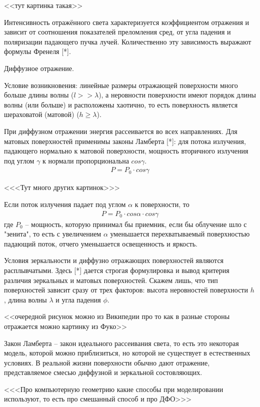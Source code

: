 <<тут картинка такая>>

Интенсивность отражённого света характеризуется коэффициентом отражения и зависит от соотношения показателей преломления сред, от угла падения и поляризации падающего пучка лучей. Количественно эту зависимость выражают формулы Френеля [*].

Диффузное отражение.

Условие возникновения: линейные размеры отражающей поверхности много больше длины волны ($ l >> \lambda $), а неровности поверхности имеют порядок длины волны (или больше) и расположены хаотично, то есть поверхность является шераховатой (матовой) ($ h \ge \lambda $). 

При диффузном отражении энергия рассеивается во всех направлениях. Для матовых поверхностей применимы законы Ламберта [*]: для потока излучения, падающего нормально к матовой поверхности, мощность вторичного излучения под углом $ \gamma $ к нормали пропорциональна $ cos \gamma $. 
\begin{gather}
 P = P_0 \cdot cos \gamma
\end {gather}

<<<Тут много других картинок>>>

Если поток излучения падает под углом $\alpha$ к поверхности, то 
\begin{gather}
 P = P_0 \cdot cos \alpha \cdot cos \gamma
\end {gather}
где $ P_0 $ -- мощность, которую принимал бы приемник, если бы облучение шло с "зенита", то есть с увеличением $\alpha$ уменьшается перехватываемый поверхностью падающий поток, отчего уменьшается освещенность и яркость. 

Условия зеркальности и диффузно отражающих поверхностей являются расплывчатыми. Здесь [*] дается строгая формулировка и вывод критерия различия зеркальных и матовых поверхностей. Скажем лишь, что тип поверхностей зависит сразу от трех факторов: высота неровностей поверхности $h$, длина волны $\lambda$ и угла падения $\phi$.

<<очередной рисунок можно из Википедии про то как в разные стороны отражается можно картинку из Фуко>>

Закон Ламберта -- закон идеального рассеивания света, то есть это некоторая модель, которой можно приблизиться, но которой не существует в естественных условиях. В реальной жизни поверхности обычно дают отражение, представляемое смесью диффузной и зеркальной состовляющих. 

<<<Про компьютерную геометрию какие способы при моделировании используют, то есть про смешанный способ и про ДФО>>>

